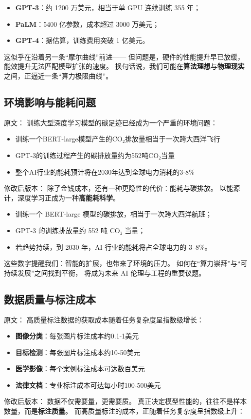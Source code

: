 \begin{itemize}
\item \textbf{GPT-3}：约 1200 万美元，相当于单 GPU 连续训练 355 年；
\item \textbf{PaLM}：5400 亿参数，成本超过 3000 万美元；
\item \textbf{GPT-4}：据估算，训练费用突破 1 亿美元。
\end{itemize}

这似乎在沿着另一条“摩尔曲线”前进——  
但问题是，硬件的性能提升早已放缓，能效提升无法匹配模型扩张的速度。  
换句话说，我们可能在\textbf{算法理想}与\textbf{物理现实}之间，正逼近一条“算力极限曲线”。



\subsection{环境影响与能耗问题}

原文：
训练大型深度学习模型的碳足迹已经成为一个严重的环境问题：
\begin{itemize}
\item 训练一个BERT-large模型产生的CO₂排放量相当于一次跨大西洋飞行
\item GPT-3的训练过程产生的碳排放量约为552吨CO₂当量
\item 整个AI行业的能耗预计将在2030年达到全球电力消耗的3-8\%
\end{itemize}
修改后版本：
除了金钱成本，还有一种更隐性的代价：能耗与碳排放。  
以能源计，深度学习正成为一种\textbf{高能耗科学}。  
\begin{itemize}
\item 训练一个 BERT-large 模型的碳排放，相当于一次跨大西洋航班；
\item GPT-3 的训练排放量约 552 吨 CO₂ 当量；
\item 若趋势持续，到 2030 年，AI 行业的能耗将占全球电力的 3–8\%。
\end{itemize}
这些数字提醒我们：智能的扩展，也带来了环境的压力。  
如何在“算力崇拜”与“可持续发展”之间找到平衡，  
将成为未来 AI 伦理与工程的重要议题。



\subsection{数据质量与标注成本}

原文：
高质量标注数据的获取成本随着任务复杂度呈指数级增长：
\begin{itemize}
\item \textbf{图像分类}：每张图片标注成本约0.1-1美元
\item \textbf{目标检测}：每张图片标注成本约10-50美元
\item \textbf{医学影像}：每个案例标注成本可达数百美元
\item \textbf{法律文档}：专业标注成本可达每小时100-500美元
\end{itemize}
修改后版本：
数据不仅需要量，更需要质。  
真正决定模型性能的，往往不是样本数量，而是\textbf{标注质量}。  
而高质量标注的成本，正随着任务复杂度呈指数级上升：  

